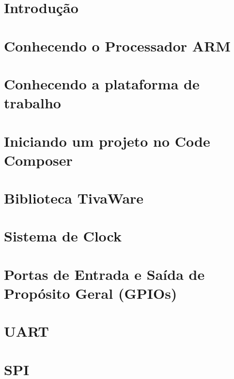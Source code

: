 \documentclass[a4paper,10pt,oneside]{book}
\begin{document}
\maketitle

\listoffigures
\listoftables

\tableofcontents

\chapter{Introdução}


\chapter{Conhecendo o Processador ARM}


\chapter{Conhecendo a plataforma de trabalho}


\chapter{Iniciando um projeto no Code Composer}


\chapter{Biblioteca TivaWare}


\chapter{Sistema de Clock}


\chapter{Portas de Entrada e Saída de Propósito Geral (GPIOs)}


\chapter{UART}


\chapter{SPI}

\end{document}

